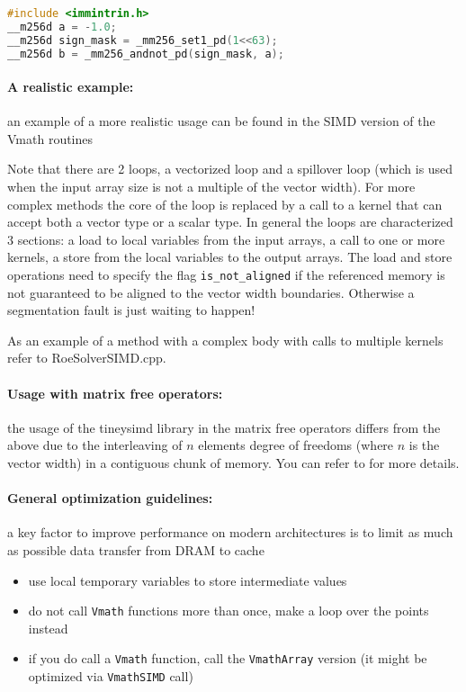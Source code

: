 \begin{lstlisting}[language=C++]
#include <immintrin.h>
__m256d a = -1.0;
__m256d sign_mask = _mm256_set1_pd(1<<63);
__m256d b = _mm256_andnot_pd(sign_mask, a);
\end{lstlisting}

\paragraph{A realistic example: } an example of a more realistic usage can be found in the SIMD version of the Vmath routines



Note that there are 2 loops, a vectorized loop and a spillover loop (which is used when the input array size is not a multiple of the vector width).
For more complex methods the core of the loop is replaced by a call to a kernel that can accept both a vector type or a scalar type.
In general the loops are characterized 3 sections: a load to local variables from the input arrays, a call to one or more kernels, a store from the local variables to the output arrays.
The load and store operations need to specify the flag \verb+is_not_aligned+ if the referenced memory is not guaranteed to be aligned to the vector width boundaries.
Otherwise a segmentation fault is just waiting to happen!

As an example of a method with a complex body with calls to multiple kernels refer to RoeSolverSIMD.cpp.

\paragraph{Usage with matrix free operators: }
the usage of the tineysimd library in the matrix free operators differs from the above due to the interleaving of $n$ elements degree of freedoms (where $n$ is the vector width) in a contiguous chunk of memory.
You can refer to \cite{moxey2020efficient} for more details.

\paragraph{General optimization guidelines: }
a key factor to improve performance on modern architectures is to limit as much as possible data transfer from DRAM to cache
\begin{itemize}
\item use local temporary variables to store intermediate values
\item do not call \verb+Vmath+ functions more than once, make a loop over the points instead
\item if you do call a \verb+Vmath+ function, call the \verb+VmathArray+ version (it might be optimized via \verb+VmathSIMD+ call)

\end{itemize}
